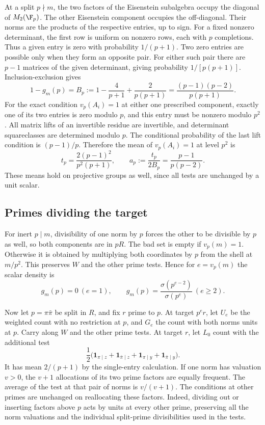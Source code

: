 At a split \(p\nmid m\), the two factors of the Eisenstein
subalgebra occupy the diagonal of \(M_2(\F_p)\). The other
Eisenstein component occupies the off-diagonal. Their norms are
the products of the respective entries, up to sign.
For a fixed nonzero determinant, the first row is uniform on
nonzero rows, each with \(p\) completions. Thus a given entry is
zero with probability \(1/(p+1)\). Two zero entries are possible
only when they form an opposite pair. For either such pair there
are \(p-1\) matrices of the given determinant, giving probability
\(1/[p(p+1)]\). Inclusion-exclusion gives
\begin{equation}\label{eq:B}
1-g_m(p)=B_p:=1-\frac4{p+1}+\frac2{p(p+1)}
             =\frac{(p-1)(p-2)}{p(p+1)}.
\end{equation}
For the exact condition \(v_p(A_i)=1\) at either one prescribed
component, exactly one of its two entries is zero modulo \(p\),
and this entry must be nonzero modulo \(p^2\). All matrix lifts of
an invertible residue are invertible, and determinant squareclasses
are determined modulo \(p\). The conditional probability of the
last lift condition is \((p-1)/p\). Therefore the mean of
\(v_p(A_i)=1\) at level \(p^2\) is
\begin{equation}\label{eq:t}
 t_p=\frac{2(p-1)^2}{p^2(p+1)},\qquad
 a_p:=\frac{t_p}{2B_p}=\frac{p-1}{p(p-2)} .
\end{equation}
These means hold on projective groups as well, since all tests
are unchanged by a unit scalar.

\subsection{Primes dividing the target}
For inert \(p\mid m\), divisibility of one norm by \(p\) forces
the other to be divisible by \(p\) as well, so both components
are in \(pR\). The bad set is empty if \(v_p(m)=1\).
Otherwise it is obtained by multiplying both coordinates by \(p\)
from the shell at \(m/p^2\). This preserves \(W\) and the other
prime tests. Hence for \(e=v_p(m)\) the scalar density is
\begin{equation}\label{eq:inert}
g_m(p)=0\ (e=1),\qquad
g_m(p)=\frac{\sigma(p^{e-2})}{\sigma(p^e)}\ (e\ge2).
\end{equation}

Now let \(p=\pi\bar\pi\) be split in \(R\), and fix \(r\) prime
to \(p\). At target \(p^e r\), let \(U_e\) be the weighted count
with no restriction at \(p\), and \(G_e\) the count with both
norms units at \(p\). Carry along \(W\) and the other prime
tests. At target \(r\), let \(L_0\) count with the additional
test
\[
 \frac12\bigl(\mathbf1_{\pi\mid z}+\mathbf1_{\bar\pi\mid z}
        +\mathbf1_{\pi\mid y}+\mathbf1_{\bar\pi\mid y}\bigr).
\]
It has mean \(2/(p+1)\) by the single-entry calculation.
If one norm has valuation \(v>0\), the \(v+1\) allocations of its
two prime factors are equally frequent. The average of the test
at that pair of norms is \(v/(v+1)\). The conditions at other
primes are unchanged on reallocating these factors. Indeed,
dividing out or inserting factors above \(p\) acts by units at
every other prime, preserving all the norm valuations and the
individual split-prime divisibilities used in the tests.

